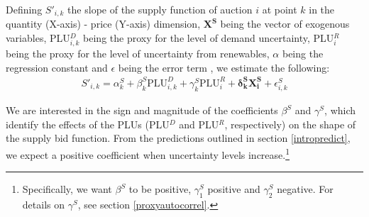 
Defining $S'_{i,k}$ the slope of the supply function of auction $i$ at point $k$ in the quantity (X-axis) - price (Y-axis) dimension, %
$\boldsymbol{X^S}$ being the vector of exogenous variables, PLU$^D_{i,k}$ being the proxy for the level of demand uncertainty, PLU$^R_i$ being the proxy for the level of uncertainty from renewables, $\alpha$ being the regression constant and $\epsilon$ being the error term%
, we estimate the following:
\begin{eqnarray}
\label{secondstagereg2}
S'_{i,k} =\alpha_{k}^S+ \beta_{k}^S \text{PLU}^D_{i,k} + \gamma_{k}^S \text{PLU}^R_{i} + \boldsymbol{\delta_{k}^S X^S_i}+\epsilon_{i,k}^S
\end{eqnarray}

We are interested in the sign and magnitude of the coefficients $\beta^S$ and $\gamma^S$, which identify the effects of the PLUs (PLU$^D$ and PLU$^R$, respectively) on the shape of the supply bid function. From the predictions outlined in section \ref{intropredict}, we expect a positive coefficient when uncertainty levels increase.\footnote{Specifically, we want $\beta^S$ to be positive, $\gamma^S_1$ positive and $\gamma^S_2$ negative. For details on $\gamma^S$, see section \ref{proxyautocorrel}.}\\ %




